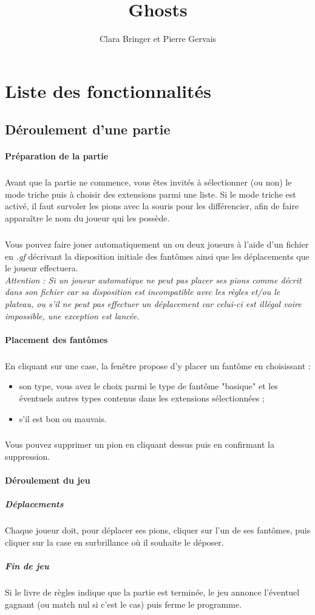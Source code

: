 \documentclass[]{report}
\title{Ghosts}
\author{Clara Bringer et Pierre Gervais}
\begin{document}
\maketitle

\section{Liste des fonctionnalités}
\subsection{Déroulement d'une partie}
\paragraph{Préparation de la partie}
\subparagraph*{}
Avant que la partie ne commence, vous êtes invités à sélectionner (ou non) le mode triche puis à choisir des extensions parmi une liste. Si le mode triche est activé, il faut survoler les pions avec la souris pour les différencier, afin de faire apparaître le nom du joueur qui les possède.
\subparagraph*{}
Vous pouvez faire jouer automatiquement un ou deux joueurs à l'aide d'un fichier en \textit{.gf} décrivant la disposition initiale des fantômes ainsi que les déplacements que le joueur effectuera.\\
\emph{Attention : Si un joueur automatique ne peut pas placer ses pions comme décrit dans son fichier car sa disposition est incompatible avec les règles et/ou le plateau, ou s'il ne peut pas effectuer un déplacement car celui-ci est illégal voire impossible, une exception est lancée.}

\paragraph{Placement des fantômes}
\subparagraph*{}
En cliquant sur une case, la fenêtre propose d'y placer un fantôme en choisissant :
\begin{itemize}
	\item son type, vous avez le choix parmi le type de fantôme "basique" et les éventuels autres types contenus dans les extensions sélectionnées ;
	\item s'il est bon ou mauvais.
\end{itemize}
\subparagraph*{}
Vous pouvez supprimer un pion en cliquant dessus puis en confirmant la suppression.

\paragraph{Déroulement du jeu}
\subparagraph{Déplacements}
Chaque joueur doit, pour déplacer ses pions, cliquer sur l'un de ses fantômes, puis cliquer sur la case en surbrillance où il souhaite le déposer.
\subparagraph{Fin de jeu}
Si le livre de règles indique que la partie est terminée, le jeu annonce l'éventuel gagnant (ou match nul si c'est le cas) puis ferme le programme.
\end{document}
